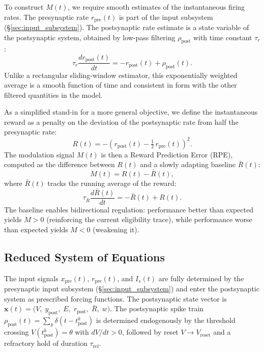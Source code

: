\documentclass[11pt]{article}
\theoremstyle{definition}
\begin{document}
To construct $M(t)$, we require smooth estimates of the instantaneous firing rates. The presynaptic rate $r_{\mathrm{pre}}(t)$ is part of the input subsystem (\S\ref{sec:input_subsystem}). The postsynaptic rate estimate is a state variable of the postsynaptic system, obtained by low-pass filtering $\rho_{\mathrm{post}}$ with time constant $\tau_r$:
\begin{equation}
    \tau_r \frac{dr_{\mathrm{post}}(t)}{dt} = -r_{\mathrm{post}}(t) + \rho_{\mathrm{post}}(t). \label{eq:rate_post}
\end{equation}
Unlike a rectangular sliding-window estimator, this exponentially weighted average is a smooth function of time and consistent in form with the other filtered quantities in the model.

As a simplified stand-in for a more general objective, we define the instantaneous reward as a penalty on the deviation of the postsynaptic rate from half the presynaptic rate:
\begin{equation} \label{eq:reward}
    R(t) = -\left(r_{\mathrm{post}}(t) - \tfrac{1}{2}\, r_{\mathrm{pre}}(t)\right)^2.
\end{equation}
The modulation signal $M(t)$ is then a Reward Prediction Error (RPE), computed as the difference between $R(t)$ and a slowly adapting baseline $\bar{R}(t)$:
\begin{equation} \label{eq:rpe}
    M(t) = R(t) - \bar{R}(t),
\end{equation}
where $\bar{R}(t)$ tracks the running average of the reward:
\begin{equation} \label{eq:reward_baseline}
    \tau_{\bar{R}} \frac{d\bar{R}(t)}{dt} = -\bar{R}(t) + R(t).
\end{equation}
The baseline enables bidirectional regulation: performance better than expected yields $M > 0$ (reinforcing the current eligibility trace), while performance worse than expected yields $M < 0$ (weakening it).

\subsection{Reduced System of Equations} \label{sec:reduced_system}

The input signals $x_{\mathrm{pre}}(t)$, $r_{\mathrm{pre}}(t)$, and $I_s(t)$ are fully determined by the presynaptic input subsystem (\S\ref{sec:input_subsystem}) and enter the postsynaptic system as prescribed forcing functions. The postsynaptic state vector is $\mathbf{x}(t) = \bigl(V,\; y_{\mathrm{post}},\; E,\; r_{\mathrm{post}},\; \bar{R},\; w\bigr)$. The postsynaptic spike train $\rho_{\mathrm{post}}(t) = \sum_k \delta(t - t_{\mathrm{post}}^k)$ is determined endogenously by the threshold crossing $V(t_{\mathrm{post}}^k) = \theta$ with $dV/dt > 0$, followed by reset $V \to V_{\mathrm{reset}}$ and a refractory hold of duration $\tau_{\mathrm{ref}}$.
\end{document}
